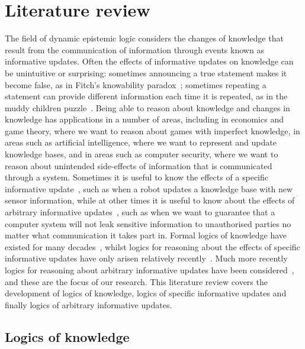 \chapter{Literature review}\label{literature}

The field of dynamic epistemic logic considers the changes of knowledge that result from the communication of information through events known as informative updates.
Often the effects of informative updates on knowledge can be unintuitive or surprising: sometimes announcing a true statement makes it become false, as in Fitch's knowability paradox~\cite{fitch:1963}; sometimes repeating a statement can provide different information each time it is repeated, as in the muddy children puzzle~\cite{barwise:1981, vanditmarsch:2007}. 
Being able to reason about knowledge and changes in knowledge has applications in a number of areas, including in economics and game theory, where we want to reason about games with imperfect knowledge, in areas such as artificial intelligence, where we want to represent and update knowledge bases, and in areas such as computer security, where we want to reason about unintended side-effects of information that is communicated through a system.
Sometimes it is useful to know the effects of a specific informative update~\cite{plaza:1989,gerbrandy:1997,baltag:1998}, such as when a robot updates a knowledge base with new sensor information, while at other times it is useful to know about the effects of arbitrary informative updates~\cite{balbiani:2007,agotnes:2010,vanditmarsch:2009}, such as when we want to guarantee that a computer system will not leak sensitive information to unauthorised parties no matter what communication it takes part in.
Formal logics of knowledge have existed for many decades~\cite{vonwright:1951,hintikka:1957,hintikka:1961,hintikka:1962}, whilst logics for reasoning about the effects of specific informative updates have only arisen relatively recently~\cite{plaza:1989,gerbrandy:1997,baltag:1998}. 
Much more recently logics for reasoning about arbitrary informative updates have been considered~\cite{balbiani:2007,vanditmarsch:2009,agotnes:2010}, and these are the focus of our research.
This literature review covers the development of logics of knowledge, logics of specific informative updates and finally logics of arbitrary informative updates.  

\section{Logics of knowledge}

